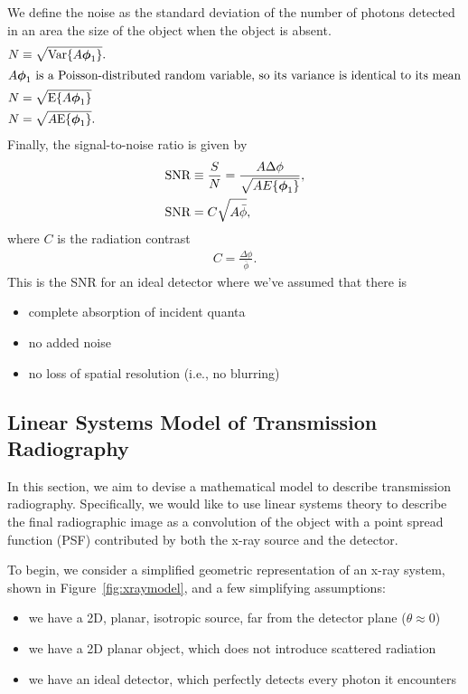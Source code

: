 \documentclass[mphy386-notes.tex]{subfiles}
\begin{document}
We define the noise as the standard deviation of the number of photons detected
in an area the size of the object when the object is absent. 
\begin{align}
  N &\equiv \sqrt{\text{Var}\{A\boldsymbol{\phi}_1\}}.\\
  \intertext{$A\boldsymbol{\phi}_1$ is a Poisson-distributed random variable, so its variance is identical to its mean}
  N &= \sqrt{\text{E}\{A\boldsymbol{\phi}_1\}}\\
  N &= \sqrt{A\text{E}\{\boldsymbol{\phi}_1\}}.
\end{align}
Finally, the signal-to-noise ratio is given by
 \begin{align}
   \text{SNR} &\equiv \frac{S}{N} = \frac{A\Delta\phi}{\sqrt{AE\{\boldsymbol{\phi}_1\}}},\\
   \text{SNR} &= C\sqrt{A\bar{\phi}}, \label{eq:snrcontrast}
 \end{align}   
where $C$ is the radiation contrast
\begin{align}
  C = \frac{\Delta\phi}{\bar{\phi}}.
\end{align}
This is the SNR for an ideal detector where we've assumed that there is
\begin{itemize}
\item complete absorption of incident quanta
\item no added noise
\item no loss of spatial resolution (i.e., no blurring)
\end{itemize}


\subsection{Linear Systems Model of Transmission Radiography}

In this section, we aim to devise a mathematical model to
describe transmission radiography. Specifically, we would like to
use linear systems theory to describe the final radiographic
image as a convolution of the object with a point spread function (PSF)
contributed by both the x-ray source and the detector.

To begin, we consider a simplified geometric representation of an x-ray
system, shown in Figure~\ref{fig:xraymodel}, and a few simplifying
assumptions:

\begin{itemize}
\item we have a 2D, planar, isotropic source, far from the detector plane ($\theta\approx 0$)
\item we have a 2D planar object, which does not introduce scattered radiation
\item we have an ideal detector, which perfectly detects every photon it encounters
\end{itemize}
\end{document}

